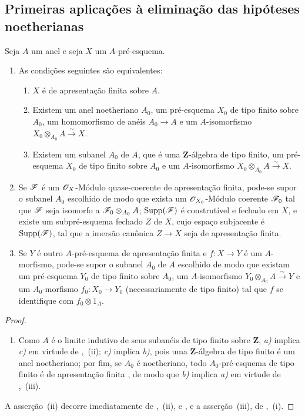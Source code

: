 \subsection{Primeiras aplicações à eliminação das hipóteses noetherianas}
\label{subsection:IV.8.9}

\begin{proposition}[8.9.1]
\label{IV.8.9.1}
Seja $A$ um anel e seja $X$ um $A$-pré-esquema.
\begin{enumerate}[label=(\roman*)]
\item As condições seguintes são equivalentes:
\begin{enumerate}[label=\emph{\alph*)}]
\item $X$ é de apresentação finita sobre $A$.
\item Existem um anel noetheriano $A_0$, um pré-esquema $X_0$ de tipo finito sobre $A_0$, um homomorfismo de anéis $A_0\to A$ e um $A$-isomorfismo $X_0\otimes_{A_0}A\xrightarrow{\sim}X$.
\item Existem um subanel $A_0$ de $A$, que é uma $\mathbf{Z}$-álgebra de tipo finito, um pré-esquema $X_0$ de tipo finito sobre $A_0$ e um $A$-isomorfismo $X_0\otimes_{A_0}A\xrightarrow{\sim}X$.
\end{enumerate}
\item Se $\mathscr{F}$ é um $\mathscr{O}_X$-Módulo quase-coerente de apresentação finita, pode-se supor o subanel $A_0$ escolhido de modo que exista um $\mathscr{O}_{X_0}$-Módulo coerente $\mathscr{F}_0$ tal que $\mathscr{F}$ seja isomorfo a $\mathscr{F}_0\otimes_{A_0}A$; $\operatorname{Supp}(\mathscr{F})$ é construtível e fechado em $X$, e existe um subpré-esquema fechado $Z$ de $X$, cujo espaço subjacente é $\operatorname{Supp}(\mathscr{F})$, tal que a imersão canônica $Z\to X$ seja de apresentação finita.
\item Se $Y$ é outro $A$-pré-esquema de apresentação finita e $f:X\to Y$ é um $A$-morfismo, pode-se supor o subanel $A_0$ de $A$ escolhido de modo que existam um pré-esquema $Y_0$ de tipo finito sobre $A_0$, um $A$-isomorfismo $Y_0\otimes_{A_0}A\xrightarrow{\sim}Y$ e um $A_0$-morfismo $f_0:X_0\to Y_0$ (necessariamente de tipo finito) tal que $f$ se identifique com $f_0\otimes 1_A$.
\end{enumerate}
\end{proposition}

\begin{proof}
\begin{enumerate}[label=(\roman*)]
\item Como $A$ é o limite indutivo de seus subanéis de tipo finito sobre $\mathbf{Z}$, \emph{a)} implica \emph{c)} em virtude de ,~(ii); \emph{c)} implica \emph{b)}, pois uma $\mathbf{Z}$-álgebra de tipo finito é um anel noetheriano; por fim, se $A_0$ é noetheriano, todo $A_0$-pré-esquema de tipo finito é de apresentação finita , de modo que \emph{b)} implica \emph{a)} em virtude de ,~(iii).
\end{enumerate}
A asserção~(ii) decorre imediatamente de ,~(ii),  e , e a asserção~(iii), de ,~(i).
\end{proof}

